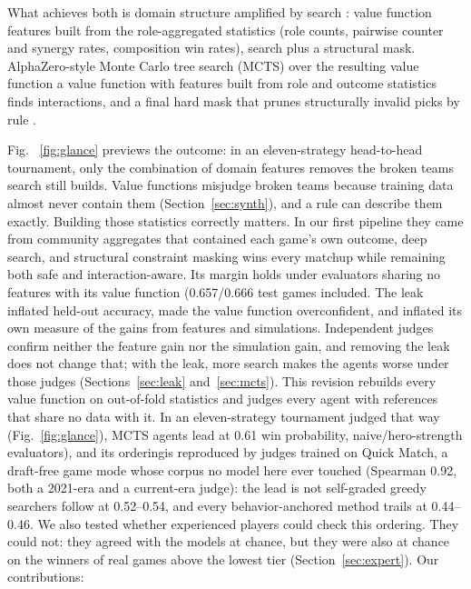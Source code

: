 \documentclass[journal]{IEEEtran}
\providecommand{\DIFaddtex}[1]{{\protect\color{blue} \sf #1}} %
\providecommand{\DIFdeltex}[1]{{\protect\color{red} \scriptsize #1}} %
\providecommand{\DIFaddbegin}{} %
\providecommand{\DIFaddend}{} %
\providecommand{\DIFdelbegin}{} %
\providecommand{\DIFdelend}{} %
\providecommand{\DIFadd}[1]{\texorpdfstring{\DIFaddtex{#1}}{#1}} %
\providecommand{\DIFdel}[1]{\texorpdfstring{\DIFdeltex{#1}}{}} %
\begin{document}
What achieves both is \DIFdelbegin \DIFdel{domain structure amplified by search : value function features built from the role-aggregated statistics (role counts, pairwise counter and synergy rates, composition win rates), }\DIFdelend \DIFaddbegin \DIFadd{search plus a structural mask. }\DIFaddend AlphaZero-style Monte Carlo tree search (MCTS) over \DIFdelbegin \DIFdel{the resulting value function }\DIFdelend \DIFaddbegin \DIFadd{a value function with features built from role and outcome statistics finds interactions}\DIFaddend , and a \DIFdelbegin \DIFdel{final }\DIFdelend hard mask that prunes structurally invalid picks \DIFdelbegin \DIFdel{by rule .
}%

\DIFdel{Fig. ~\ref{fig:glance} previews the outcome: in an eleven-strategy head-to-head tournament, only the combination of domain features }\DIFdelend \DIFaddbegin \DIFadd{removes the broken teams search still builds. Value functions misjudge broken teams because training data almost never contain them (Section~\ref{sec:synth}), and a rule can describe them exactly. Building those statistics correctly matters. In our first pipeline they came from community aggregates that contained each game's own outcome}\DIFaddend , \DIFdelbegin \DIFdel{deep search, and structural constraint masking wins every matchup while remaining both safe and interaction-aware. Its margin holds under evaluators sharing no features with its value function (0.657/0.666 }\DIFdelend \DIFaddbegin \DIFadd{test games included. The leak inflated held-out accuracy, made the value function overconfident, and inflated its own measure of the gains from features and simulations. Independent judges confirm neither the feature gain nor the simulation gain, and removing the leak does not change that; with the leak, more search makes the agents worse under those judges (Sections~\ref{sec:leak} and~\ref{sec:mcts}). This revision rebuilds every value function on out-of-fold statistics and judges every agent with references that share no data with it. In an eleven-strategy tournament judged that way (Fig.~\ref{fig:glance}), MCTS agents lead at 0.61 }\DIFaddend win probability, \DIFdelbegin \DIFdel{naive/hero-strength evaluators), and its orderingis reproduced by judges trained on Quick Match, a draft-free game mode whose corpus no model here ever touched (Spearman 0.92, both a 2021-era and a current-era judge): the lead is not self-graded}\DIFdelend \DIFaddbegin \DIFadd{greedy searchers follow at 0.52--0.54, and every behavior-anchored method trails at 0.44--0.46. We also tested whether experienced players could check this ordering. They could not: they agreed with the models at chance, but they were also at chance on the winners of real games above the lowest tier (Section~\ref{sec:expert})}\DIFaddend . Our contributions:
\end{document}
